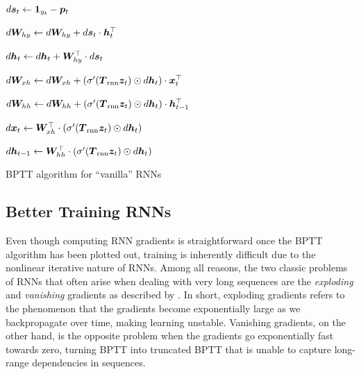 \begin{algorithm}
{
$d\bm{s}_{t} \leftarrow \bm{1}_{y_t} - \bm{p}_{t}$

$d\bm{W}_{hy} \leftarrow d\bm{W}_{hy} + d\bm{s}_{t} \cdot \bm{h}_{t}^\top$

$d\bm{h}_{t} \leftarrow d\bm{h}_{t} + \bm{W}_{hy}^\top \cdot d\bm{s}_{t}$

$d\bm{W}_{xh} \leftarrow d\bm{W}_{xh} + \left(\sigma'(\mbox{\boldmath{$T$}}_{\text{rnn}} \bm{z}_{t}) \odot d\bm{h}_{t}\right) \cdot \bm{x}_{t}^\top$

$d\bm{W}_{hh} \leftarrow d\bm{W}_{hh} + \left(\sigma'(\mbox{\boldmath{$T$}}_{\text{rnn}} \bm{z}_{t}) \odot d\bm{h}_{t}\right) \cdot \bm{h}_{t-1}^\top$

$d\bm{x}_{t} \leftarrow \bm{W}_{xh}^\top \cdot \left(\sigma'(\mbox{\boldmath{$T$}}_{\text{rnn}} \bm{z}_{t}) \odot d\bm{h}_{t}\right)$

$d\bm{h}_{t-1} \leftarrow \bm{W}_{hh}^\top \cdot \left(\sigma'(\mbox{\boldmath{$T$}}_{\text{rnn}} \bm{z}_{t}) \odot d\bm{h}_{t}\right)$
}
\caption{BPTT algorithm for ``vanilla'' RNNs}
\end{algorithm}

\subsection{Better Training RNNs}


Even though computing RNN gradients is straightforward once 
the BPTT algorithm has been plotted out, training is inherently difficult due to the nonlinear
iterative nature of RNNs. Among all reasons, 
the two classic problems of RNNs that often arise when dealing with very long sequences are the {\it
exploding} and {\it vanishing} gradients as
described by . In short, exploding gradients refers to the
phenomenon that the gradients become exponentially large as we backpropagate
over time, making learning unstable. Vanishing gradients, on the
other hand, is the opposite problem when the gradients go exponentially fast
towards zero, turning BPTT into truncated BPTT that is unable to capture long-range
dependencies in sequences. 

